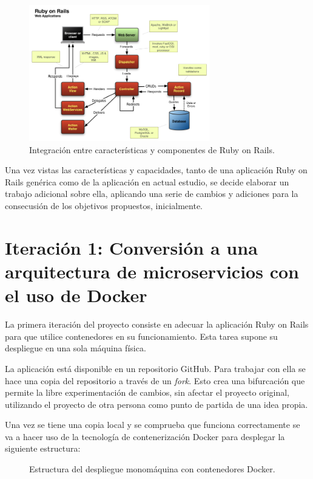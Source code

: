 \begin{figure}[H]
\centering
\includegraphics[width=0.7\textwidth]{images/figures/rubyonrails.png}
\caption{Integración entre características y componentes de Ruby on Rails.\label{fig:figure_placement_example}}
\end{figure}

Una vez vistas las características y capacidades, tanto de una aplicación Ruby on Rails genérica como de la aplicación en actual estudio, se decide elaborar un trabajo adicional sobre ella, aplicando una serie de cambios y adiciones para la consecusión de los objetivos propuestos, inicialmente.

\section{Iteración 1: Conversión a una arquitectura de microservicios con el uso de Docker}

La primera iteración del proyecto consiste en adecuar la aplicación Ruby on Rails para que utilice contenedores en su funcionamiento. Esta tarea supone su despliegue en una sola máquina física.

La aplicación  está disponible en un repositorio GitHub. Para trabajar con ella se hace una copia del repositorio a través de un \textit{fork}. Esto crea una bifurcación que permite la libre experimentación de cambios, sin afectar el proyecto original, utilizando el proyecto de otra persona como punto de partida de una idea propia.

Una vez se tiene una copia local y se comprueba que funciona correctamente se va a hacer uso de la tecnología de contenerización Docker para desplegar la siguiente estructura:

\begin{figure}[H]
\caption{Estructura del despliegue monomáquina con contenedores Docker.\label{fig:figure_docker_microservices}}
\end{figure}

